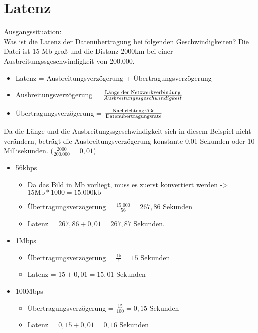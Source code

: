 \documentclass{article}
\begin{document}
	\section{Latenz}
	Ausgangssituation:\\
	Was ist die Latenz der Datenübertragung bei folgenden Geschwindigkeiten? Die Datei ist 15 Mb groß und die Distanz 2000km bei einer Ausbreitungssgeschwindigkeit von 200.000.
	\begin{itemize}
		\item{Latenz = Ausbreitungsverzögerung + Übertragungsverzögerung}
		\item{Ausbreitungsverzögerung = $\frac{\textnormal{Länge der Netzwerkverbindung}}{Ausbreitungssgeschwindigkeit}$}
		\item{Übertragungsverzögerung = $\frac{\textnormal{Nachrichtengröße}}{\textnormal{Datenübertragungsrate}}$}
	\end{itemize}
	Da die Länge und die Ausbreitungssgeschwindigkeit sich in diesem Beispiel nicht verändern, beträgt die Ausbreitungsverzögerung konstante 0,01 Sekunden oder 10 Millisekunden. ($\frac{2000}{200.000} = 0,01$)
	\begin{itemize}
		\item{56kbps}
		\begin{itemize}
			\item{Da das Bild in Mb vorliegt, muss es zuerst konvertiert werden -> $15\mathrm{Mb} * 1000 = 15.000\mathrm{kb}$}
			\item{Übertragungsverzögerung = $\frac{15.000}{56} = 267,86$ Sekunden}
			\item{Latenz = $267,86 + 0,01 = 267,87$ Sekunden. }
		\end{itemize}
		\item{1Mbps}
		\begin{itemize}
			\item{Übertragungsverzögerung = $\frac{15}{1} = 15$ Sekunden}
			\item{Latenz = $15 + 0,01 = 15,01$ Sekunden}
		\end{itemize}
		\item{100Mbps}
		\begin{itemize}
			\item{Übertragungsverzögerung = $\frac{15}{100} = 0,15$ Sekunden}
			\item{Latenz = $0,15 + 0,01 = 0,16$ Sekunden}
		\end{itemize}
	\end{itemize}












	
\end{document}
